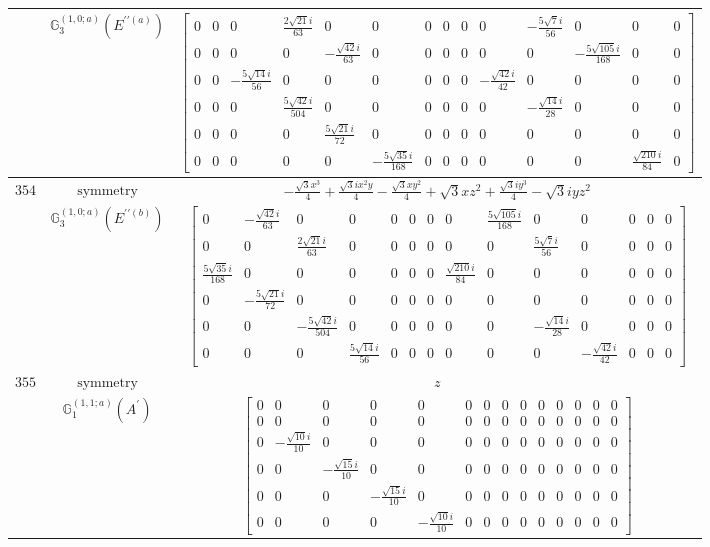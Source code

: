 \documentclass[fleqn,8pt,landscape]{jsarticle}
\begin{document}
\begin{longtable}{ccc}
$  $ & $ \mathbb{G}_{3}^{(1,0;a)}(E^{\prime\prime(a)}) $ & $ \begin{bmatrix} 0 & 0 & 0 & \frac{2 \sqrt{21} i}{63} & 0 & 0 & 0 & 0 & 0 & 0 & - \frac{5 \sqrt{7} i}{56} & 0 & 0 & 0 \\ 0 & 0 & 0 & 0 & - \frac{\sqrt{42} i}{63} & 0 & 0 & 0 & 0 & 0 & 0 & - \frac{5 \sqrt{105} i}{168} & 0 & 0 \\ 0 & 0 & - \frac{5 \sqrt{14} i}{56} & 0 & 0 & 0 & 0 & 0 & 0 & - \frac{\sqrt{42} i}{42} & 0 & 0 & 0 & 0 \\ 0 & 0 & 0 & \frac{5 \sqrt{42} i}{504} & 0 & 0 & 0 & 0 & 0 & 0 & - \frac{\sqrt{14} i}{28} & 0 & 0 & 0 \\ 0 & 0 & 0 & 0 & \frac{5 \sqrt{21} i}{72} & 0 & 0 & 0 & 0 & 0 & 0 & 0 & 0 & 0 \\ 0 & 0 & 0 & 0 & 0 & - \frac{5 \sqrt{35} i}{168} & 0 & 0 & 0 & 0 & 0 & 0 & \frac{\sqrt{210} i}{84} & 0 \end{bmatrix} $ \\ \hline
$ 354 $ & $ \text{symmetry} $ & $ - \frac{\sqrt{3} x^{3}}{4} + \frac{\sqrt{3} i x^{2} y}{4} - \frac{\sqrt{3} x y^{2}}{4} + \sqrt{3} x z^{2} + \frac{\sqrt{3} i y^{3}}{4} - \sqrt{3} i y z^{2} $ \\
$  $ & $ \mathbb{G}_{3}^{(1,0;a)}(E^{\prime\prime(b)}) $ & $ \begin{bmatrix} 0 & - \frac{\sqrt{42} i}{63} & 0 & 0 & 0 & 0 & 0 & 0 & \frac{5 \sqrt{105} i}{168} & 0 & 0 & 0 & 0 & 0 \\ 0 & 0 & \frac{2 \sqrt{21} i}{63} & 0 & 0 & 0 & 0 & 0 & 0 & \frac{5 \sqrt{7} i}{56} & 0 & 0 & 0 & 0 \\ \frac{5 \sqrt{35} i}{168} & 0 & 0 & 0 & 0 & 0 & 0 & \frac{\sqrt{210} i}{84} & 0 & 0 & 0 & 0 & 0 & 0 \\ 0 & - \frac{5 \sqrt{21} i}{72} & 0 & 0 & 0 & 0 & 0 & 0 & 0 & 0 & 0 & 0 & 0 & 0 \\ 0 & 0 & - \frac{5 \sqrt{42} i}{504} & 0 & 0 & 0 & 0 & 0 & 0 & - \frac{\sqrt{14} i}{28} & 0 & 0 & 0 & 0 \\ 0 & 0 & 0 & \frac{5 \sqrt{14} i}{56} & 0 & 0 & 0 & 0 & 0 & 0 & - \frac{\sqrt{42} i}{42} & 0 & 0 & 0 \end{bmatrix} $ \\ \hline
$ 355 $ & $ \text{symmetry} $ & $ z $ \\
$  $ & $ \mathbb{G}_{1}^{(1,1;a)}(A^{\prime}) $ & $ \begin{bmatrix} 0 & 0 & 0 & 0 & 0 & 0 & 0 & 0 & 0 & 0 & 0 & 0 & 0 & 0 \\ 0 & 0 & 0 & 0 & 0 & 0 & 0 & 0 & 0 & 0 & 0 & 0 & 0 & 0 \\ 0 & - \frac{\sqrt{10} i}{10} & 0 & 0 & 0 & 0 & 0 & 0 & 0 & 0 & 0 & 0 & 0 & 0 \\ 0 & 0 & - \frac{\sqrt{15} i}{10} & 0 & 0 & 0 & 0 & 0 & 0 & 0 & 0 & 0 & 0 & 0 \\ 0 & 0 & 0 & - \frac{\sqrt{15} i}{10} & 0 & 0 & 0 & 0 & 0 & 0 & 0 & 0 & 0 & 0 \\ 0 & 0 & 0 & 0 & - \frac{\sqrt{10} i}{10} & 0 & 0 & 0 & 0 & 0 & 0 & 0 & 0 & 0 \end{bmatrix} $ \\ \hline

\end{longtable}
\end{document}
